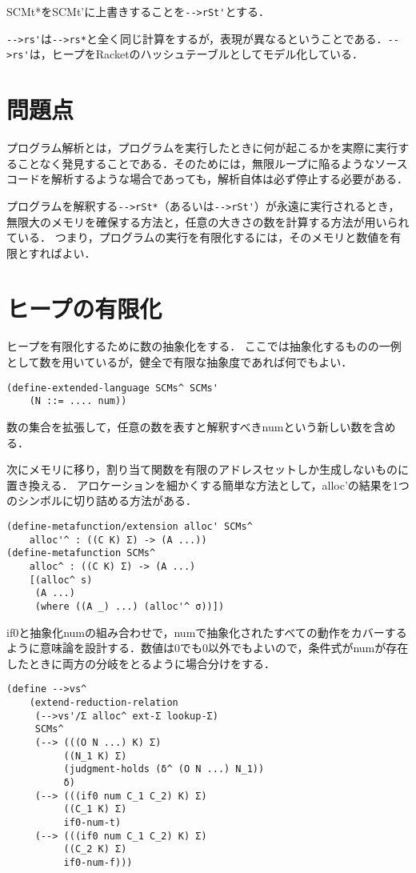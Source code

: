 \documentclass[twocolumn]{jsarticle}
\begin{document}
SCMt*をSCMt'に上書きすることを\verb|-->rSt'|とする．

\verb|-->rs'|は\verb|-->rs*|と全く同じ計算をするが，表現が異なるということである．\verb|-->rs'|は，ヒープをRacketのハッシュテーブルとしてモデル化している．

\section{問題点}

プログラム解析とは，プログラムを実行したときに何が起こるかを実際に実行することなく発見することである．そのためには，無限ループに陥るようなソースコードを解析するような場合であっても，解析自体は必ず停止する必要がある．

プログラムを解釈する\verb|-->rSt*|（あるいは\verb|-->rSt'|）が永遠に実行されるとき，無限大のメモリを確保する方法と，任意の大きさの数を計算する方法が用いられている．
つまり，プログラムの実行を有限化するには，そのメモリと数値を有限とすればよい．


\section{ヒープの有限化}
ヒープを有限化するために数の抽象化をする．
ここでは抽象化するものの一例として数を用いているが，健全で有限な抽象度であれば何でもよい．

\begin{verbatim}
(define-extended-language SCMs^ SCMs'
    (N ::= .... num))
\end{verbatim}
数の集合を拡張して，任意の数を表すと解釈すべきnumという新しい数を含める．

次にメモリに移り，割り当て関数を有限のアドレスセットしか生成しないものに置き換える．
アロケーションを細かくする簡単な方法として，alloc'の結果を1つのシンボルに切り詰める方法がある．
\begin{verbatim}
(define-metafunction/extension alloc' SCMs^
    alloc'^ : ((C K) Σ) -> (A ...))
(define-metafunction SCMs^
    alloc^ : ((C K) Σ) -> (A ...)
    [(alloc^ s)
     (A ...)
     (where ((A _) ...) (alloc'^ σ))])
\end{verbatim}

if0と抽象化numの組み合わせで，numで抽象化されたすべての動作をカバーするように意味論を設計する．数値は0でも0以外でもよいので，条件式がnumが存在したときに両方の分岐をとるように場合分けをする．

\begin{verbatim}
(define -->vs^
    (extend-reduction-relation
     (-->vs'/Σ alloc^ ext-Σ lookup-Σ)
     SCMs^
     (--> (((O N ...) K) Σ)
          ((N_1 K) Σ)
          (judgment-holds (δ^ (O N ...) N_1))
          δ)
     (--> (((if0 num C_1 C_2) K) Σ)
          ((C_1 K) Σ)
          if0-num-t)
     (--> (((if0 num C_1 C_2) K) Σ)
          ((C_2 K) Σ)
          if0-num-f)))
\end{verbatim}
\end{document}
